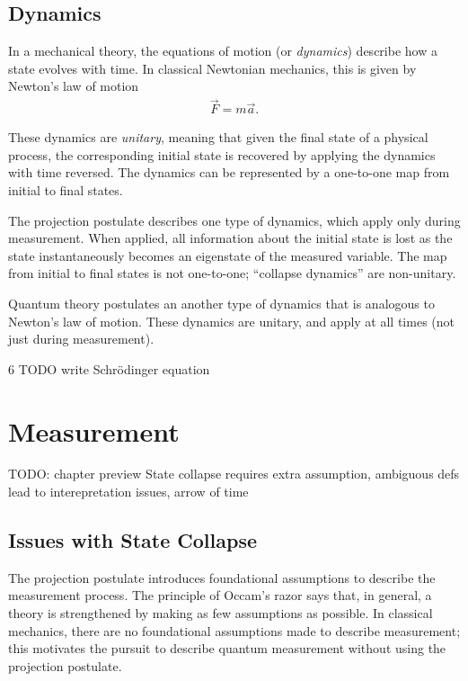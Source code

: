\section{Dynamics}
In a mechanical theory, the equations of motion (or \textit{dynamics}) describe how a state evolves with time. In classical Newtonian mechanics, this is given by Newton's law of motion
\begin{align}
  \vec{F} = m\vec{a}.
\end{align}

These dynamics are \textit{unitary}, meaning that given the final state of a physical process, the corresponding initial state is recovered by applying the dynamics with time reversed. The dynamics can be represented by a one-to-one map from initial to final states.

The projection postulate describes one type of dynamics, which apply only during measurement. When applied, all information about the initial state is lost as the state instantaneously becomes an eigenstate of the measured variable. The map from initial to final states is not one-to-one; ``collapse dynamics'' are non-unitary.

Quantum theory postulates an another type of dynamics that is analogous to Newton's law of motion. These dynamics are unitary, and apply at all times (not just during measurement).

\begin{Thm:Postulate}{6}
  TODO write Schrödinger equation
\end{Thm:Postulate}

\chapter{Measurement}

TODO: chapter preview
State collapse requires extra assumption, ambiguous defs lead to interepretation issues, arrow of time

\section{Issues with State Collapse}

The projection postulate introduces foundational assumptions to describe the measurement process. The principle of Occam's razor says that, in general, a theory is strengthened by making as few assumptions as possible. In classical mechanics, there are no foundational assumptions made to describe measurement; this motivates the pursuit to describe quantum measurement without using the projection postulate.

